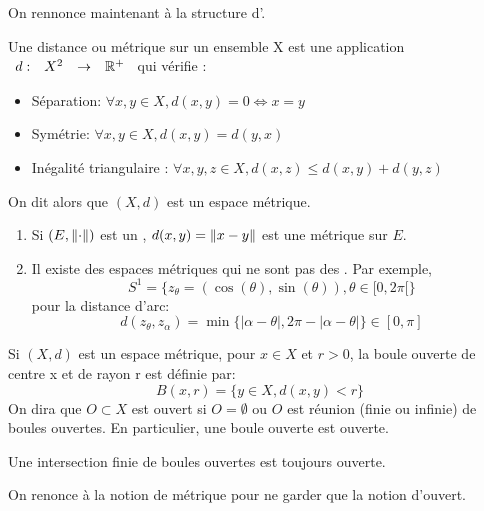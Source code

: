 \documentclass[]{report}
\begin{document}
    On rennonce maintenant à la structure d'\ev.

    \begin{df}{}{}
        Une distance ou métrique sur un ensemble X  est une application $\begin{array}{ccccc} d : & X^2 & \to & \mathbb{R}^+ \end{array}$ qui vérifie :
        \begin{itemize}
            \item Séparation: $\forall x,y \in X, d(x,y)=0 \iff x=y$
            \item Symétrie: $\forall x,y\in X, d(x,y)=d(y,x)$
            \item Inégalité triangulaire : $\forall x,y,z \in X, d(x,z)\le d(x,y)+d(y,z)$
        \end{itemize}
        On dit alors que $(X,d)$ est un espace métrique.
    \end{df}

    \begin{ex}{}{}
        \begin{enumerate}
            \item Si $(E,\lVert \cdot \rVert)$ est un \evn, $d(x,y)=\lVert x-y \rVert$ est une métrique sur $E$.
            \item Il existe des espaces métriques qui ne sont pas des \evs. Par exemple, 
            \[S^1=\{z_\theta=(\cos(\theta),\sin(\theta)),\theta\in [0,2\pi[\}\] 
            pour la distance d'arc:
            \[ d(z_\theta,z_\alpha)=\min \{|\alpha-\theta|,2\pi-|\alpha-\theta|\}\in [0,\pi]\] 
        \end{enumerate}
    \end{ex}

    \begin{df}{}{}
        Si $(X,d)$ est un espace métrique, pour $x\in X$ et $r>0$, la boule ouverte de centre x et de rayon r est définie par:
        \[B(x,r)=\{y\in X, d(x,y)<r\}\]
        On dira que $O\subset X$ est ouvert si $O=\emptyset$ ou $O$ est réunion (finie ou infinie) de boules ouvertes. En particulier, une boule ouverte est ouverte.
    \end{df}

    \begin{re}{}{}
        Une intersection finie de boules ouvertes est toujours ouverte.
    \end{re}

    On renonce à la notion de métrique pour ne garder que la notion d'ouvert.
\end{document}
